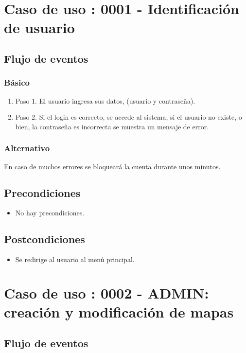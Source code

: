 \section{Caso de uso : 0001 - Identificación de usuario}\label{sec:uc0}
\subsection{Flujo de eventos}
\subsubsection{Básico}

\begin{enumerate}
\item Paso 1.
El usuario ingresa sus datos, (usuario y contraseña).
\item Paso 2.
Si el login es correcto, se accede al sistema, si el usuario no existe, o bien, la contraseña es incorrecta se muestra un mensaje de error.
\end{enumerate}

\subsubsection{Alternativo}
En caso de muchos errores se bloqueará la cuenta durante unos minutos.

\subsection{Precondiciones}
\begin{itemize}
\item No hay precondiciones.
\end{itemize}

\subsection{Postcondiciones}
\begin{itemize}
\item Se redirige al usuario al menú principal.
\end{itemize}



\section{Caso de uso : 0002 - ADMIN: creación y modificación de mapas}\label{sec:uc0}
\subsection{Flujo de eventos}
